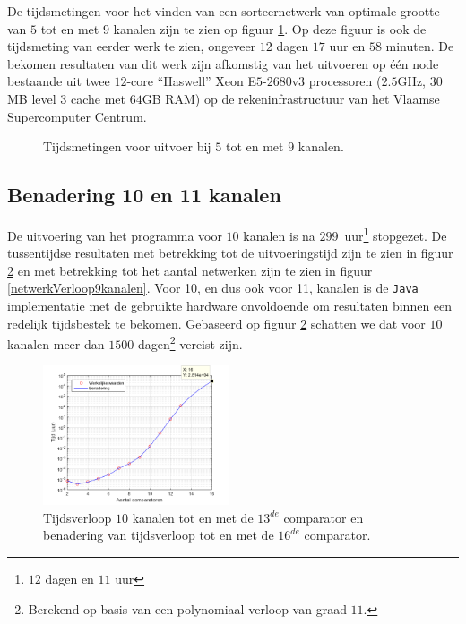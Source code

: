 \documentclass{article}
\begin{document}
De tijdsmetingen voor het vinden van een sorteernetwerk van optimale grootte van $5$ tot en met $9$ kanalen zijn te zien op figuur \ref{Tijdsresultaten}.
Op deze figuur is ook de tijdsmeting van eerder werk te zien, ongeveer $12$ dagen $17$ uur en $58$ minuten\cite{sortingNetworksSize2014}.
De bekomen resultaten van dit werk zijn afkomstig van het uitvoeren op \'e\'en node bestaande uit twee $12$-core ``Haswell'' Xeon E$5$-$2680$v$3$ processoren ($2.5$GHz, $30$MB level $3$ cache met $64$GB RAM) op de rekeninfrastructuur van het Vlaamse Supercomputer Centrum.
\begin{figure}[!h]
\centering
{}
\caption{Tijdsmetingen voor uitvoer bij $5$ tot en met $9$ kanalen.}
\label{Tijdsresultaten}
\end{figure}

\subsection{Benadering 10 en 11 kanalen}
De uitvoering van het programma voor $10$ kanalen is na $299$~uur\footnote{$12$ dagen en $11$ uur} stopgezet. %
De tussentijdse resultaten met betrekking tot de uitvoeringstijd zijn te zien in figuur \ref{tijdverloop10kanalen} en met betrekking tot het aantal netwerken zijn te zien in figuur \ref{netwerkVerloop9kanalen}.
Voor 10, en dus ook voor 11, kanalen is de \texttt{Java} implementatie met de gebruikte hardware onvoldoende om resultaten binnen een redelijk tijdsbestek te bekomen.
Gebaseerd op figuur \ref{tijdverloop10kanalen} schatten we dat voor $10$ kanalen meer dan $1500$ dagen\footnote{Berekend op basis van een polynomiaal verloop van graad $11$.} vereist zijn. 
\begin{figure}[!h]
\centering
\includegraphics[width = 0.49\textwidth]{Benadering10_paper.png}
\caption{Tijdsverloop $10$ kanalen tot en met de  $13^{de}$ comparator en benadering van tijdsverloop tot en met de $16^{de}$ comparator.}
\label{tijdverloop10kanalen}
\end{figure}
\end{document}
